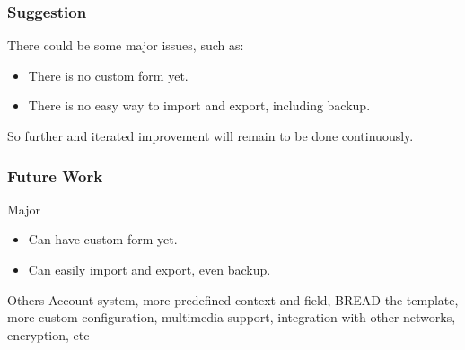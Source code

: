 \documentclass[10pt, compress]{beamer}
\begin{document}
\begin{frame}[fragile]
  \frametitle{Suggestion}

  There could be some major issues, such as:

  \begin{itemize} \itemsep0pt
    \item There is no custom form yet.
    \item There is no easy way to import and export, including backup.
  \end{itemize}

  So further and iterated improvement will remain to be done continuously.

\end{frame}


\begin{frame}[fragile]
  \frametitle{Future Work}

  \begin{block}{Major}
    \begin{itemize} \itemsep0pt
      \item Can have custom form yet.
      \item Can easily import and export, even backup.
    \end{itemize}
  \end{block}

  \begin{block}{Others}
    Account system, more predefined context and field, \textsc{BREAD} the template, more custom configuration, multimedia support, integration with other networks, encryption, etc
  \end{block}

\end{frame}



\end{document}
